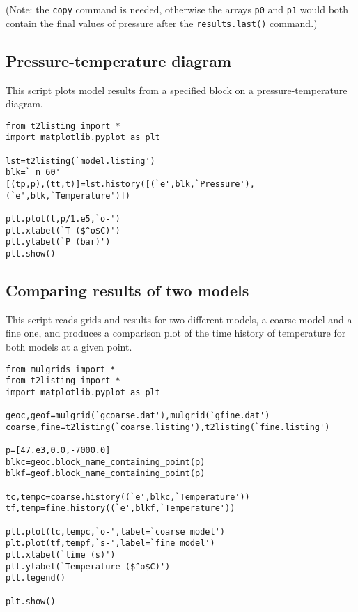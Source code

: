 (Note: the \texttt{copy} command is needed, otherwise the arrays \texttt{p0} and \texttt{p1} would both contain the final values of pressure after the \texttt{results.last()} command.)

\subsection{Pressure-temperature diagram}

This script plots model results from a specified block on a pressure-temperature diagram.

\begin{verbatim}
from t2listing import *
import matplotlib.pyplot as plt

lst=t2listing(`model.listing')
blk=` n 60'
[(tp,p),(tt,t)]=lst.history([(`e',blk,`Pressure'),(`e',blk,`Temperature')])

plt.plot(t,p/1.e5,`o-')
plt.xlabel(`T ($^o$C)')
plt.ylabel(`P (bar)')
plt.show()
\end{verbatim}

\subsection{Comparing results of two models}
\label{comparison_example}

This script reads grids and results for two different models, a coarse model and a fine one, and produces a comparison plot of the time history of temperature for both models at a given point.

\begin{verbatim}
from mulgrids import *
from t2listing import *
import matplotlib.pyplot as plt

geoc,geof=mulgrid(`gcoarse.dat'),mulgrid(`gfine.dat')
coarse,fine=t2listing(`coarse.listing'),t2listing(`fine.listing')

p=[47.e3,0.0,-7000.0]
blkc=geoc.block_name_containing_point(p)
blkf=geof.block_name_containing_point(p)

tc,tempc=coarse.history((`e',blkc,`Temperature'))
tf,temp=fine.history((`e',blkf,`Temperature'))

plt.plot(tc,tempc,`o-',label=`coarse model')
plt.plot(tf,tempf,`s-',label=`fine model')
plt.xlabel(`time (s)')
plt.ylabel(`Temperature ($^o$C)')
plt.legend()

plt.show()
\end{verbatim}

